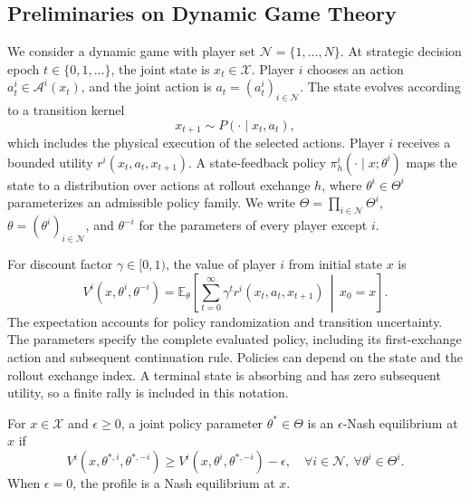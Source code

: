\documentclass[pmlr]{jmlr}
\newcommand{\Players}{\mathcal{N}}
\newcommand{\States}{\mathcal{X}}
\newcommand{\Actions}{\mathcal{A}}
\newcommand{\E}{\mathbb{E}}
\begin{document}
\subsection{Preliminaries on Dynamic Game Theory}
\label{sec:preliminaries}

We consider a dynamic game with player set $\Players=\{1,\ldots,N\}$. At strategic decision epoch $t\in\{0,1,\ldots\}$, the joint state is $x_t\in\States$. Player $i$ chooses an action $a_t^i\in\Actions^i(x_t)$, and the joint action is $a_t=(a_t^i)_{i\in\Players}$. The state evolves according to a transition kernel
\begin{equation}
  x_{t+1}\sim P(\cdot\mid x_t,a_t),
  \label{eq:transition}
\end{equation}
which includes the physical execution of the selected actions. Player $i$ receives a bounded utility $r^i(x_t,a_t,x_{t+1})$. A state-feedback policy $\pi_h^i(\cdot\mid x;\theta^i)$ maps the state to a distribution over actions at rollout exchange $h$, where $\theta^i\in\Theta^i$ parameterizes an admissible policy family. We write $\Theta=\prod_{i\in\Players}\Theta^i$, $\theta=(\theta^i)_{i\in\Players}$, and $\theta^{-i}$ for the parameters of every player except $i$.

For discount factor $\gamma\in[0,1)$, the value of player $i$ from initial state $x$ is
\begin{equation}
  V^i(x,\theta^i,\theta^{-i})=
  \E_{\theta}\!\left[\sum_{t=0}^{\infty}
  \gamma^t r^i(x_t,a_t,x_{t+1})\,\middle|\,x_0=x\right].
  \label{eq:value}
\end{equation}
The expectation accounts for policy randomization and transition uncertainty. The parameters specify the complete evaluated policy, including its first-exchange action and subsequent continuation rule. Policies can depend on the state and the rollout exchange index. A terminal state is absorbing and has zero subsequent utility, so a finite rally is included in this notation.

\begin{definition}
For $x\in\States$ and $\epsilon\geq0$, a joint policy parameter $\theta^*\in\Theta$ is an $\epsilon$-Nash equilibrium at $x$ if
\begin{equation}
  V^i(x,\theta^{*,i},\theta^{*,-i})
  \geq V^i(x,\theta^i,\theta^{*,-i})-\epsilon,
  \quad \forall i\in\Players,\ \forall\theta^i\in\Theta^i.
  \label{eq:nash}
\end{equation}
When $\epsilon=0$, the profile is a Nash equilibrium at $x$.
\end{definition}
\end{document}
